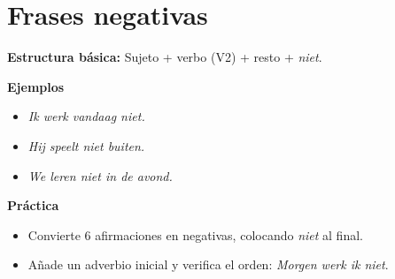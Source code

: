 \section{Frases negativas}
\textbf{Estructura básica:} Sujeto + verbo (V2) + resto + \textit{niet}.

\textbf{Ejemplos}
\begin{itemize}[leftmargin=*]
  \item \textit{Ik werk vandaag niet.}
  \item \textit{Hij speelt niet buiten.}
  \item \textit{We leren niet in de avond.}
\end{itemize}

\textbf{Práctica}
\begin{itemize}[leftmargin=*]
  \item Convierte 6 afirmaciones en negativas, colocando \textit{niet} al final.
  \item Añade un adverbio inicial y verifica el orden: \textit{Morgen werk ik niet}.
\end{itemize}

